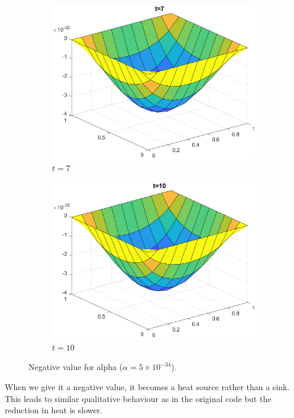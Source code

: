 \documentclass[]{article}
\begin{document}
	\begin{figure}[htbp]
		\centering	
		\vspace{1em}
		
		\begin{subfigure}[b]{0.45\textwidth}
			\includegraphics[width=\textwidth]{images/h3_t3.eps}
			\caption{$t = 7$}
			\label{fig:image7}
		\end{subfigure}
		\hfill
		\begin{subfigure}[b]{0.45\textwidth}
			\includegraphics[width=\textwidth]{images/h3_t4.eps}
			\caption{$t = 10$}
			\label{fig:image4}
		\end{subfigure}
		
		\caption{Negative value for alpha ($\alpha = 5 \times 10^{-34}$).}
		\label{fig:all_images}
	\end{figure}
	\newpage
	When we give it a negative value, it becomes a heat source rather than a sink. This leads to similar qualitative behaviour as in the original code but the reduction in heat is slower. 
	
\end{document}
